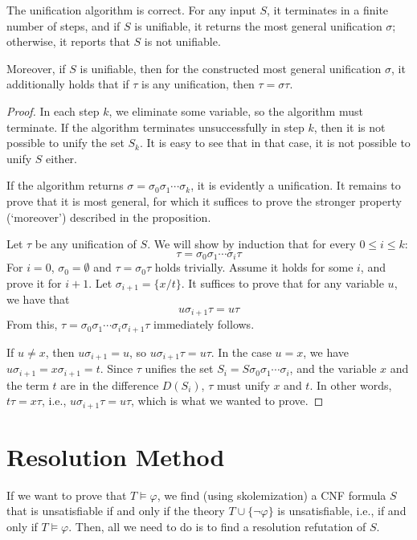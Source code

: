 \begin{proposition}\label{proposition:unification-algorithm}
The unification algorithm is correct. For any input $S$, it terminates in a finite number of steps, and if $S$ is unifiable, it returns the most general unification $\sigma$; otherwise, it reports that $S$ is not unifiable.

Moreover, if $S$ is unifiable, then for the constructed most general unification $\sigma$, it additionally holds that if $\tau$ is any unification, then $\tau=\sigma\tau$.
\end{proposition}
\begin{proof}
In each step $k$, we eliminate some variable, so the algorithm must terminate. If the algorithm terminates unsuccessfully in step $k$, then it is not possible to unify the set $S_k$. It is easy to see that in that case, it is not possible to unify $S$ either.

If the algorithm returns $\sigma=\sigma_0\sigma_1\cdots\sigma_k$, it is evidently a unification. It remains to prove that it is most general, for which it suffices to prove the stronger property (`moreover') described in the proposition.

Let $\tau$ be any unification of $S$. We will show by induction that for every $0\leq i\leq k$:
$$
\tau=\sigma_0\sigma_1\cdots\sigma_i\tau
$$
For $i=0$, $\sigma_0=\emptyset$ and $\tau=\sigma_0\tau$ holds trivially. Assume it holds for some $i$, and prove it for $i+1$. Let $\sigma_{i+1}=\{x/t\}$. It suffices to prove that for any variable $u$, we have that 
$$
u\sigma_{i+1}\tau=u\tau
$$
From this, $\tau=\sigma_0\sigma_1\cdots\sigma_i\sigma_{i+1}\tau$ immediately follows.

If $u\neq x$, then $u\sigma_{i+1}=u$, so $u\sigma_{i+1}\tau=u\tau$. In the case $u=x$, we have $u\sigma_{i+1}=x\sigma_{i+1}=t$. Since $\tau$ unifies the set $S_i=S\sigma_0\sigma_1\cdots\sigma_i$, and the variable $x$ and the term $t$ are in the difference $D(S_i)$, $\tau$ must unify $x$ and $t$. In other words, $t\tau=x\tau$, i.e., $u\sigma_{i+1}\tau=u\tau$, which is what we wanted to prove.
\end{proof}

\section{Resolution Method}\label{section:predicate-resolution-method}

If we want to prove that $T\models\varphi$, we find (using skolemization) a CNF formula $S$ that is unsatisfiable if and only if the theory $T\cup\{\neg\varphi\}$ is unsatisfiable, i.e., if and only if $T\models\varphi$. Then, all we need to do is to find a resolution refutation of $S$.

